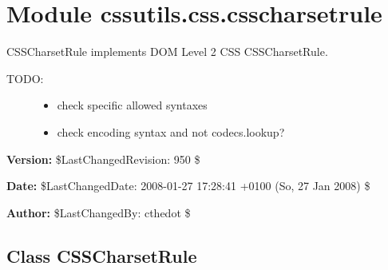 %
%
%


\section{Module cssutils.css.csscharsetrule}

    \label{cssutils:css:csscharsetrule}

CSSCharsetRule implements DOM Level 2 CSS CSSCharsetRule.
\begin{description}
\item[{TODO:}] \leavevmode \begin{itemize}
\item {} 
check specific allowed syntaxes

\item {} 
check encoding syntax and not codecs.lookup?

\end{itemize}

\end{description}
\textbf{Version:} \$LastChangedRevision: 950 \$



\textbf{Date:} \$LastChangedDate: 2008-01-27 17:28:41 +0100 (So, 27 Jan 2008) \$



\textbf{Author:} \$LastChangedBy: cthedot \$





\subsection{Class CSSCharsetRule}

